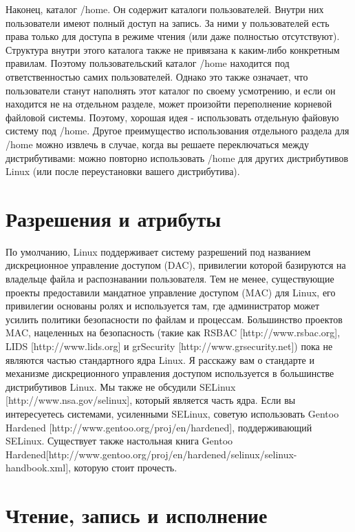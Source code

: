 \documentclass[10pt]{book}
\begin{document}
Наконец, каталог /home. Он содержит каталоги пользователей. Внутри них пользователи имеют полный доступ на запись. За ними у пользователей есть права только для доступа в режиме чтения (или даже полностью отсутствуют). Структура внутри этого каталога также не привязана к каким-либо конкретным правилам. Поэтому пользовательский каталог /home находится под ответственностью самих пользователей.
Однако это также означает, что пользователи станут наполнять этот каталог по своему усмотрению, и если он находится не на отдельном разделе, может произойти переполнение корневой файловой системы. Поэтому, хорошая идея -  использовать отдельную файовую систему под /home.
Другое преимущество использования отдельного раздела для /home можно извлечь в случае, когда вы решаете переключаться между дистрибутивами: можно повторно использовать /home для других дистрибутивов Linux (или после переустановки вашего дистрибутива).

\section{Разрешения и атрибуты}

По умолчанию, Linux поддерживает систему разрешений под названием дискреционное управление доступом (DAC), привилегии которой базируются на владельце файла и распознавании пользователя. Тем не менее, существующие проекты предоставили мандатное управление доступом (MAC) для Linux, его привилегии основаны ролях и используется там, где администратор может усилить политики безопасности по файлам и процессам.
Большинство проектов MAC, нацеленных на безопасность  (такие как RSBAC [http://www.rsbac.org], LIDS [http://www.lids.org] и grSecurity [http://www.grsecurity.net]) пока не являются частью стандартного ядра Linux. Я расскажу вам о стандарте и механизме дискреционного управления доступом используется в большинстве дистрибутивов Linux. Мы также не обсудили SELinux [http://www.nsa.gov/selinux], который является часть ядра. Если вы интересуетесь системами, усиленными SELinux, советую использовать Gentoo Hardened [http://www.gentoo.org/proj/en/hardened], поддерживающий SELinux. Существует также настольная книга Gentoo Hardened[http://www.gentoo.org/proj/en/hardened/selinux/selinux-handbook.xml], которую стоит прочесть. 

\section{Чтение, запись и исполнение}
\end{document}
